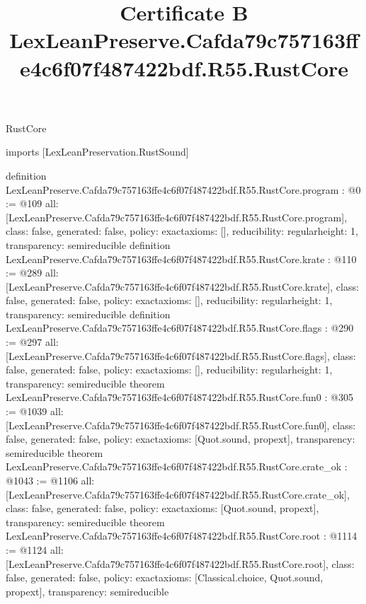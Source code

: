 \begin{lexlean}{RustCore}
\title{Certificate B LexLeanPreserve.Cafda79c757163ffe4c6f07f487422bdf.R55.RustCore}
\begin{coremodule}
imports [LexLeanPreservation.RustSound]

definition LexLeanPreserve.Cafda79c757163ffe4c6f07f487422bdf.R55.RustCore.program : @0 := @109 {
  all: [LexLeanPreserve.Cafda79c757163ffe4c6f07f487422bdf.R55.RustCore.program],
  class: false,
  generated: false,
  policy: exact{axioms: []},
  reducibility: regular{height: 1},
  transparency: semireducible
}
definition LexLeanPreserve.Cafda79c757163ffe4c6f07f487422bdf.R55.RustCore.krate : @110 := @289 {
  all: [LexLeanPreserve.Cafda79c757163ffe4c6f07f487422bdf.R55.RustCore.krate],
  class: false,
  generated: false,
  policy: exact{axioms: []},
  reducibility: regular{height: 1},
  transparency: semireducible
}
definition LexLeanPreserve.Cafda79c757163ffe4c6f07f487422bdf.R55.RustCore.flags : @290 := @297 {
  all: [LexLeanPreserve.Cafda79c757163ffe4c6f07f487422bdf.R55.RustCore.flags],
  class: false,
  generated: false,
  policy: exact{axioms: []},
  reducibility: regular{height: 1},
  transparency: semireducible
}
theorem LexLeanPreserve.Cafda79c757163ffe4c6f07f487422bdf.R55.RustCore.fun0 : @305 := @1039 {
  all: [LexLeanPreserve.Cafda79c757163ffe4c6f07f487422bdf.R55.RustCore.fun0],
  class: false,
  generated: false,
  policy: exact{axioms: [Quot.sound, propext]},
  transparency: semireducible
}
theorem LexLeanPreserve.Cafda79c757163ffe4c6f07f487422bdf.R55.RustCore.crate_ok : @1043 := @1106 {
  all: [LexLeanPreserve.Cafda79c757163ffe4c6f07f487422bdf.R55.RustCore.crate_ok],
  class: false,
  generated: false,
  policy: exact{axioms: [Quot.sound, propext]},
  transparency: semireducible
}
theorem LexLeanPreserve.Cafda79c757163ffe4c6f07f487422bdf.R55.RustCore.root : @1114 := @1124 {
  all: [LexLeanPreserve.Cafda79c757163ffe4c6f07f487422bdf.R55.RustCore.root],
  class: false,
  generated: false,
  policy: exact{axioms: [Classical.choice, Quot.sound, propext]},
  transparency: semireducible
}


\end{coremodule}
\end{lexlean}

